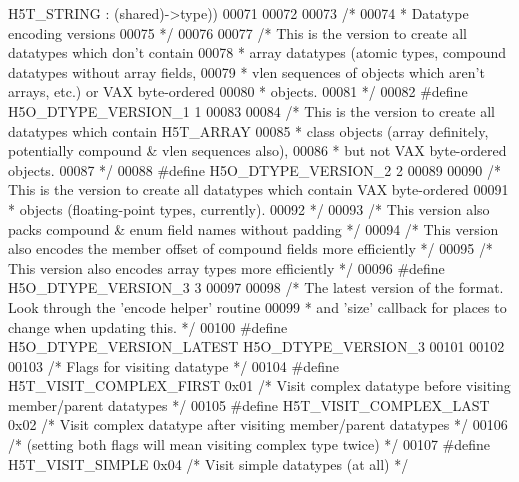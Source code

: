 \begin{DoxyCode}
{       H5T\_STRING : (shared)->type))}
00071 
00072 
00073 \textcolor{comment}{/*}
00074 \textcolor{comment}{ * Datatype encoding versions}
00075 \textcolor{comment}{ */}
00076 
00077 \textcolor{comment}{/* This is the version to create all datatypes which don't contain}
00078 \textcolor{comment}{ * array datatypes (atomic types, compound datatypes without array fields,}
00079 \textcolor{comment}{ * vlen sequences of objects which aren't arrays, etc.) or VAX byte-ordered}
00080 \textcolor{comment}{ * objects.}
00081 \textcolor{comment}{ */}
00082 \textcolor{preprocessor}{#define H5O\_DTYPE\_VERSION\_1 1}
00083 
00084 \textcolor{comment}{/* This is the version to create all datatypes which contain H5T\_ARRAY}
00085 \textcolor{comment}{ * class objects (array definitely, potentially compound & vlen sequences also),}
00086 \textcolor{comment}{ * but not VAX byte-ordered objects.}
00087 \textcolor{comment}{ */}
00088 \textcolor{preprocessor}{#define H5O\_DTYPE\_VERSION\_2 2}
00089 
00090 \textcolor{comment}{/* This is the version to create all datatypes which contain VAX byte-ordered}
00091 \textcolor{comment}{ * objects (floating-point types, currently).}
00092 \textcolor{comment}{ */}
00093 \textcolor{comment}{/* This version also packs compound & enum field names without padding */}
00094 \textcolor{comment}{/* This version also encodes the member offset of compound fields more efficiently */}
00095 \textcolor{comment}{/* This version also encodes array types more efficiently */}
00096 \textcolor{preprocessor}{#define H5O\_DTYPE\_VERSION\_3 3}
00097 
00098 \textcolor{comment}{/* The latest version of the format.  Look through the 'encode helper' routine}
00099 \textcolor{comment}{ *      and 'size' callback for places to change when updating this. */}
00100 \textcolor{preprocessor}{#define H5O\_DTYPE\_VERSION\_LATEST H5O\_DTYPE\_VERSION\_3}
00101 
00102 
00103 \textcolor{comment}{/* Flags for visiting datatype */}
00104 \textcolor{preprocessor}{#define H5T\_VISIT\_COMPLEX\_FIRST 0x01            }\textcolor{comment}{/* Visit complex datatype before visiting member/parent
       datatypes */}\textcolor{preprocessor}{}
00105 \textcolor{preprocessor}{#define H5T\_VISIT\_COMPLEX\_LAST  0x02            }\textcolor{comment}{/* Visit complex datatype after visiting member/parent
       datatypes */}\textcolor{preprocessor}{}
00106                                                 \textcolor{comment}{/* (setting both flags will mean visiting complex type
       twice) */}
00107 \textcolor{preprocessor}{#define H5T\_VISIT\_SIMPLE        0x04            }\textcolor{comment}{/* Visit simple datatypes (at all) */}\textcolor{preprocessor}{}

\end{DoxyCode}
